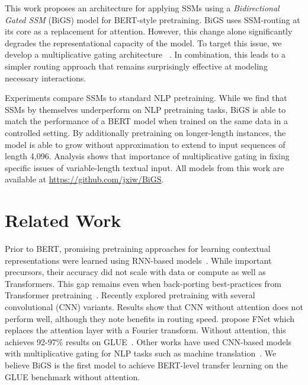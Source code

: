 This work proposes an architecture for applying SSMs using a \emph{Bidirectional Gated SSM} (BiGS) model for BERT-style pretraining. BiGS uses SSM-routing at its core as a replacement for attention. However, this change alone significantly degrades the representational capacity of the model. To target this issue, we develop a multiplicative gating architecture  ~\cite{dauphin2017language, hua2022transformer,mehta2022long}. In combination, this leads to a simpler routing approach that remains surprisingly effective at modeling necessary interactions. 

Experiments compare SSMs to standard NLP pretraining. While we find that SSMs by themselves underperform on NLP pretraining tasks, BiGS is able to match the performance of a BERT model when trained on the same data in a controlled setting.  By additionally pretraining on longer-length instances, the model is able to grow without approximation to extend to input sequences of length 4,096. Analysis shows that importance of multiplicative gating in fixing specific issues of variable-length textual input. All models from this work are available at \url{https://github.com/jxiw/BiGS}.

\section{Related Work}

Prior to BERT, promising pretraining approaches for learning contextual representations were learned using RNN-based models~\cite{mccann2017learned,DBLP:conf/naacl/PetersNIGCLZ18}.  While important precursors, their accuracy did not scale with data or compute as well as Transformers. This gap remains even when back-porting best-practices from Transformer pretraining~\citep{peters2019tune}. Recently \citet{tay2021pre} explored pretraining with several convolutional (CNN) variants. Results show that CNN without attention does not perform well, although they note benefits in routing speed. \citet{lee2021fnet} propose FNet which replaces the attention layer with a Fourier transform. Without attention, this achieves 92-97\% results on GLUE~\citep{wang2018glue}. Other works have used CNN-based models with multiplicative gating for NLP tasks such as machine translation~\citep{dauphin2017language}. We believe BiGS is the first model to achieve BERT-level transfer learning on the GLUE benchmark without attention. 

